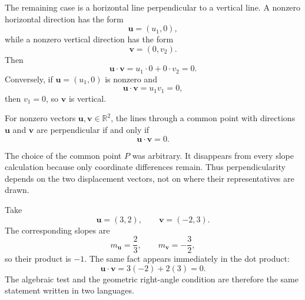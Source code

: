 The remaining case is a horizontal line perpendicular to a vertical line.  A
nonzero horizontal direction has the form
\[
\mathbf u=(u_1,0),
\]
while a nonzero vertical direction has the form
\[
\mathbf v=(0,v_2).
\]
Then
\[
\mathbf u\cdot\mathbf v
=
u_1\cdot0+0\cdot v_2
=0.
\]
Conversely, if $\mathbf u=(u_1,0)$ is nonzero and
\[
\mathbf u\cdot\mathbf v=u_1v_1=0,
\]
then $v_1=0$, so $\mathbf v$ is vertical.

\begin{theorembox}
For nonzero vectors $\mathbf u,\mathbf v\in\mathbb R^2$, the lines through a
common point with directions $\mathbf u$ and $\mathbf v$ are perpendicular if
and only if
\[
\mathbf u\cdot\mathbf v=0.
\]
\end{theorembox}

The choice of the common point $P$ was arbitrary.  It disappears from every
slope calculation because only coordinate differences remain.  Thus
perpendicularity depends on the two displacement vectors, not on where their
representatives are drawn.

\begin{examplebox}
Take
\[
\mathbf u=(3,2),
\qquad
\mathbf v=(-2,3).
\]
The corresponding slopes are
\[
m_{\mathbf u}=\frac23,
\qquad
m_{\mathbf v}=-\frac32,
\]
so their product is $-1$.  The same fact appears immediately in the dot
product:
\[
\mathbf u\cdot\mathbf v
=3(-2)+2(3)
=0.
\]
The algebraic test and the geometric right-angle condition are therefore the
same statement written in two languages.
\end{examplebox}